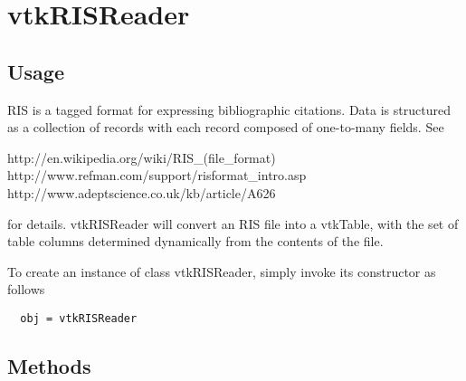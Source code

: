 \section{vtkRISReader}

\subsection{Usage}

 RIS is a tagged format for expressing bibliographic citations.  Data is
 structured as a collection of records with each record composed of
 one-to-many fields.  See

 http://en.wikipedia.org/wiki/RIS\_(file\_format)
 http://www.refman.com/support/risformat\_intro.asp
 http://www.adeptscience.co.uk/kb/article/A626

 for details.  vtkRISReader will convert an RIS file into a vtkTable, with
 the set of table columns determined dynamically from the contents of the
 file.

To create an instance of class vtkRISReader, simply
invoke its constructor as follows
\begin{verbatim}
  obj = vtkRISReader
\end{verbatim}
\subsection{Methods}

